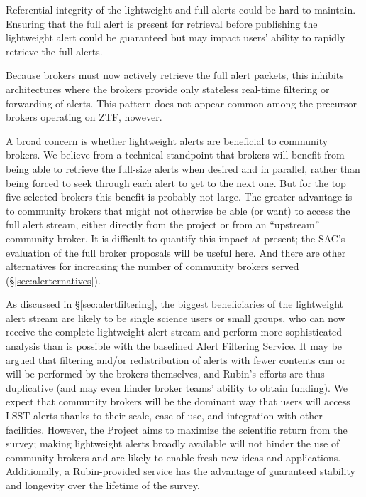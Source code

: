 \documentclass[DM,authoryear,toc]{lsstdoc}
\begin{document}
Referential integrity of the lightweight and full alerts could be hard to maintain. 
Ensuring that the full alert is present for retrieval before publishing the lightweight alert could be guaranteed
but may impact users' ability to rapidly retrieve the full alerts.

Because brokers must now actively retrieve the full alert packets, this inhibits architectures where the brokers provide only stateless real-time filtering or forwarding of alerts.
This pattern does not appear common among the precursor brokers operating on ZTF, however.

A broad concern is whether lightweight alerts are beneficial to community brokers.
We believe from a technical standpoint that brokers will benefit from being able to retrieve the full-size alerts when desired and in parallel, rather than being forced to seek through each alert to get to the next one.
But for the top five selected brokers this benefit is probably not large.
The greater advantage is to community brokers that might not otherwise be able (or want) to access the full alert stream, either directly from the project or from an ``upstream'' community broker.
It is difficult to quantify this impact at present; the SAC's evaluation of the full broker proposals will be useful here.
And there are other alternatives for increasing the number of community brokers served (\S \ref{sec:alerternatives}).

As discussed in \S \ref{sec:alertfiltering}, the biggest beneficiaries of the lightweight alert stream are likely to be single science users or small groups, who can now receive the complete lightweight alert stream and perform more sophisticated analysis than is possible with the baselined Alert Filtering Service.
It may be argued that filtering and/or redistribution of alerts with fewer contents can or will be performed by the brokers themselves, and Rubin's efforts are thus duplicative (and may even hinder broker teams' ability to obtain funding).
We expect that community brokers will be the dominant way that users will access LSST alerts thanks to their scale, ease of use, and integration with other facilities.
However, the Project aims to maximize the scientific return from the survey; making lightweight alerts broadly available will not hinder the use of community brokers and are likely to enable fresh new ideas and applications.
Additionally, a Rubin-provided service has the advantage of guaranteed stability and longevity over the lifetime of the survey.
\end{document}
